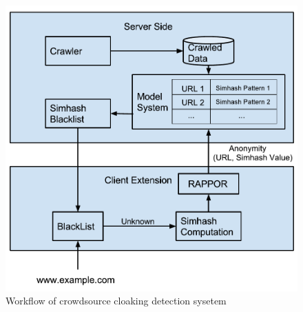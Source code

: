\begin{figure}[t]
  \centering
  \includegraphics[width=.45\textwidth]{fig/crowdsourcing-cloaking-detection-system}
  \caption{Workflow of crowdsource cloaking detection sysetem}
  \label{fig:workflow}
\end{figure}

%
